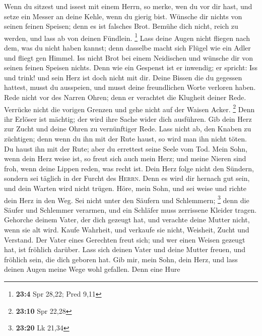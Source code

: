  Wenn du sitzest und issest mit einem Herrn, so merke, wen
du vor dir hast,  und setze ein Messer an deine Kehle,
wenn du gierig bist.  Wünsche dir nichts von seinen feinen
Speisen; denn es ist falsches Brot.  Bemühe dich nicht,
reich zu werden, und lass ab von deinen Fündlein. \footnote{\textbf{23:4}
  Spr 28,22; Pred 9,11}  Lass deine Augen nicht fliegen
nach dem, was du nicht haben kannst; denn dasselbe macht sich Flügel wie
ein Adler und fliegt gen Himmel.  Iss nicht Brot bei einem
Neidischen und wünsche dir von seinen feinen Speisen nichts.
 Denn wie ein Gespenst ist er inwendig; er spricht: Iss
und trink! und sein Herz ist doch nicht mit dir.  Deine
Bissen die du gegessen hattest, musst du ausspeien, und musst deine
freundlichen Worte verloren haben.  Rede nicht vor des
Narren Ohren; denn er verachtet die Klugheit deiner Rede.
 Verrücke nicht die vorigen Grenzen und gehe nicht auf
der Waisen Acker. \footnote{\textbf{23:10} Spr 22,28} 
Denn ihr Erlöser ist mächtig; der wird ihre Sache wider dich ausführen.
 Gib dein Herz zur Zucht und deine Ohren zu vernünftiger
Rede.  Lass nicht ab, den Knaben zu züchtigen; denn wenn
du ihn mit der Rute haust, so wird man ihn nicht töten. 
Du haust ihn mit der Rute; aber du errettest seine Seele vom Tod.
 Mein Sohn, wenn dein Herz weise ist, so freut sich auch
mein Herz;  und meine Nieren sind froh, wenn deine Lippen
reden, was recht ist.  Dein Herz folge nicht den Sündern,
sondern sei täglich in der Furcht des \textsc{Herrn}. 
Denn es wird dir hernach gut sein, und dein Warten wird nicht trügen.
 Höre, mein Sohn, und sei weise und richte dein Herz in
den Weg.  Sei nicht unter den Säufern und Schlemmern;
\footnote{\textbf{23:20} Lk 21,34}  denn die Säufer und
Schlemmer verarmen, und ein Schläfer muss zerrissene Kleider tragen.
 Gehorche deinem Vater, der dich gezeugt hat, und
verachte deine Mutter nicht, wenn sie alt wird.  Kaufe
Wahrheit, und verkaufe sie nicht, Weisheit, Zucht und Verstand.
 Der Vater eines Gerechten freut sich; und wer einen
Weisen gezeugt hat, ist fröhlich darüber.  Lass sich
deinen Vater und deine Mutter freuen, und fröhlich sein, die dich
geboren hat.  Gib mir, mein Sohn, dein Herz, und lass
deinen Augen meine Wege wohl gefallen.  Denn eine Hure
